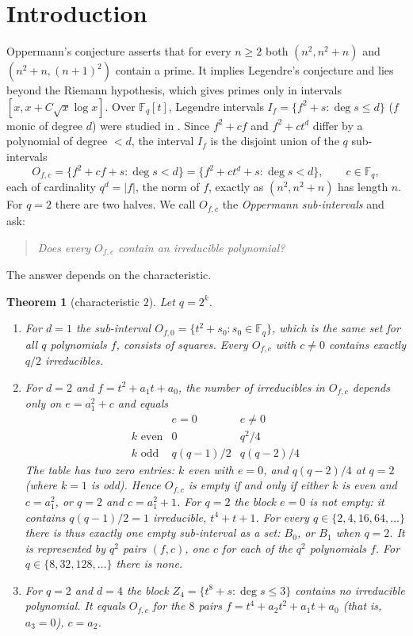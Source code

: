 \documentclass[11pt,a4paper]{amsart}
\newtheorem{theorem}{Theorem}[section]
\theoremstyle{definition}
\theoremstyle{remark}
\newcommand{\F}{\mathbb{F}}
\begin{document}
\section{Introduction}

Oppermann's conjecture \cite{Oppermann} asserts that for every $n\ge2$ both $(n^2,n^2+n)$ and $(n^2+n,(n+1)^2)$
contain a prime. It implies Legendre's conjecture and lies beyond the Riemann hypothesis, which gives primes only
in intervals $[x,x+C\sqrt x\log x]$. Over $\F_q[t]$, Legendre intervals $I_f=\{f^2+s:\deg s\le d\}$ ($f$ monic of
degree $d$) were studied in \cite{ChenI}. Since $f^2+cf$ and $f^2+ct^d$ differ by a polynomial of degree $<d$, the
interval $I_f$ is the disjoint union of the $q$ sub-intervals
\begin{equation}\label{eq:Ofc}
O_{f,c}=\{f^2+cf+s:\deg s<d\}=\{f^2+ct^d+s:\deg s<d\},\qquad c\in\F_q,
\end{equation}
each of cardinality $q^d=|f|$, the norm of $f$, exactly as $(n^2,n^2+n)$ has length $n$. For $q=2$ there are two
halves. We call $O_{f,c}$ the \emph{Oppermann sub-intervals} and ask:

\begin{quote}
\emph{Does every $O_{f,c}$ contain an irreducible polynomial?}
\end{quote}

\noindent The answer depends on the characteristic.

\begin{theorem}[characteristic $2$]\label{thm:main2}
Let $q=2^k$.
\begin{enumerate}
\item[(A)] For $d=1$ the sub-interval $O_{f,0}=\{t^2+s_0:s_0\in\F_q\}$, which is the same set for all $q$
polynomials $f$, consists of squares. Every $O_{f,c}$ with $c\ne0$ contains exactly $q/2$ irreducibles.
\item[(B)] For $d=2$ and $f=t^2+a_1t+a_0$, the number of irreducibles in $O_{f,c}$ depends only on $e=a_1^2+c$ and
equals
\[
\begin{array}{c|cc}
 & e=0 & e\ne0\\\hline
k\text{ even} & 0 & q^2/4\\
k\text{ odd} & q(q-1)/2 & q(q-2)/4
\end{array}
\]
The table has two zero entries: $k$ even with $e=0$, and $q(q-2)/4$ at $q=2$ (where $k=1$ is odd). Hence
$O_{f,c}$ is empty if and only if either $k$ is even and $c=a_1^2$, or $q=2$ and $c=a_1^2+1$. For $q=2$ the block
$e=0$ is \emph{not} empty: it contains $q(q-1)/2=1$ irreducible, $t^4+t+1$. For every
$q\in\{2,4,16,64,\dots\}$ there is thus exactly one empty sub-interval as a set: $B_0$, or $B_1$ when $q=2$. It is
represented by $q^2$ pairs $(f,c)$, one $c$ for each of the $q^2$ polynomials $f$. For $q\in\{8,32,128,\dots\}$
there is none.
\item[(C)] For $q=2$ and $d=4$ the block $Z_4=\{t^8+s:\deg s\le3\}$ contains no irreducible polynomial. It equals
$O_{f,c}$ for the $8$ pairs $f=t^4+a_2t^2+a_1t+a_0$ (that is, $a_3=0$), $c=a_2$.
\end{enumerate}
\end{theorem}
\end{document}
